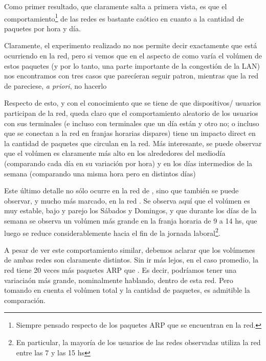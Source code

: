 \par Como primer resultado, que claramente salta a primera vista, es que el
comportamiento\footnote{Siempre pensado respecto de los paquetes ARP que se
encuentran en la red.} de las redes es bastante ca\'otico en cuanto a la cantidad
de paquetes por hora y d\'ia.

\par Claramente, el experimento realizado no nos permite decir exactamente que
est\'a ocurriendo en la red, pero si vemos que en el aspecto de como var\'ia
el vol\'umen de estos paquetes (y por lo tanto, una parte importante de la
congesti\'on de la LAN) nos encontramos con tres casos que parec\'ieran
seguir patron, mientras que la red de  pareciese,
\textit{a priori}, no hacerlo

\par Respecto de esto, y con el conocimiento que se tiene de que dispositivos/%
usuarios participan de la red, queda claro que el comportamiento aleatorio de
los usuarios con sus terminales (e incluso con terminales que un d\'ia est\'an
y otro no; o incluso que se conectan a la red en franjas horarias dispares)
tiene un impacto direct en la cantidad de paquetes que circulan en la red. M\'as
interesante, se puede observar que el vol\'umen es claramente m\'as alto en los
alrededores del mediod\'ia (comparando cada d\'ia en su variaci\'on por hora) y
en los d\'ias intermedios de la semana (comparando una misma hora pero en distintos
d\'ias)

\par Este \'ultimo detalle no s\'olo ocurre en la red de ,
sino que tambi\'en se puede observar, y mucho m\'as marcado, en la red
. Se observa aqu\'i que el vol\'umen es muy estable, bajo y
parejo los S\'abados y Domingos, y que durante los d\'ias de la semana se observa
un vol\'umen m\'as grande en la franja horaria de 9 a 14 hs, que luego se reduce
considerablemente hacia el fin de la jornada laboral\footnote{En particular, la
mayor\'ia de los usuarios de las redes observadas utiliza la red entre las 7 y
las 15 hs}. 

\par A pesar de ver este comportamiento similar, debemos aclarar
que los vol\'umenes de ambas redes son claramente distintos. Sin ir m\'as lejos,
en el caso promedio, la red  tiene 20 veces m\'as paquetes ARP
que . Es decir, podr\'iamos tener una variacia\'on m\'as
grande, nominalmente hablando, dentro de esta red. Pero tomando en cuenta
el vol\'umen total y la cantidad de paquetes, es admitible la comparaci\'on.

